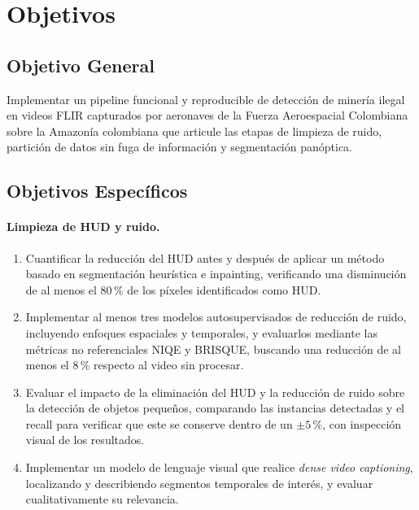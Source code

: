 \section{Objetivos}

\subsection{Objetivo General}
Implementar un pipeline funcional y reproducible de detección de minería ilegal en videos FLIR capturados por aeronaves de la Fuerza Aeroespacial Colombiana sobre la Amazonía colombiana que articule las etapas de limpieza de ruido, partición de datos sin fuga de información y segmentación panóptica.

\subsection{Objetivos Específicos}

\paragraph{Limpieza de HUD y ruido.}
\begin{enumerate}
    \item Cuantificar la reducción del HUD antes y después de aplicar un método basado en segmentación heurística e inpainting, verificando una disminución de al menos el 80\,\% de los píxeles identificados como HUD.
    \item Implementar al menos tres modelos autosupervisados de reducción de ruido, incluyendo enfoques espaciales y temporales, y evaluarlos mediante las métricas no referenciales NIQE y BRISQUE, buscando una reducción de al menos el 8\,\% respecto al video sin procesar.
    \item Evaluar el impacto de la eliminación del HUD y la reducción de ruido sobre la detección de objetos pequeños, comparando las instancias detectadas y el recall para verificar que este se conserve dentro de un $\pm 5\,\%$, con inspección visual de los resultados.
    \item Implementar un modelo de lenguaje visual que realice \textit{dense video captioning}, localizando y describiendo segmentos temporales de interés, y evaluar cualitativamente su relevancia.
\end{enumerate}

